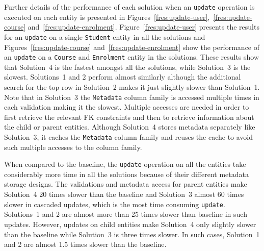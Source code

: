 Further details of the performance of each solution when an
\texttt{update} operation is executed on each entity is presented in 
Figures~\ref{fres:update-user},~\ref{fres:update-course}
and~\ref{fres:update-enrolment}.
Figure~\ref{fres:update-user} presents the results for an \texttt{update} on a
single \texttt{Student} entity in all the solutions and
Figures~\ref{fres:update-course} and~\ref{fres:update-enrolment} show the
performance of an \texttt{update} on a \texttt{Course} and \texttt{Enrolment}
entity in the solutions. These results show that Solution~4 is the fastest
amongst all the solutions, while Solution~3 is the slowest.
Solutions~1 and 2 perform almost similarly although the additional search for
the top row in Solution~2 makes it just slightly slower than Solution~1.
Note that in Solution~3 the \texttt{Metadata} column family is accessed multiple
times in each validation making it the slowest. Multiple accesses are needed in
order to first retrieve the relevant \ac{FK} constraints and then to retrieve
information about the child or parent entities. Although Solution~4 stores
metadata separately like Solution~3, it caches the \texttt{Metadata} column
family and reuses the cache to avoid such multiple accesses to the column
family.

When compared to the baseline, the \texttt{update} operation on all the
entities take considerably more time in all the solutions because of
their different metadata storage designs. The validations and metadata access
for parent entities make Solution~4 20 times slower than the baseline and
Solution~3 almost 60 times slower in cascaded updates, which is the most
time consuming \texttt{update}. 
Solutions~1 and 2 are almost more than 25 times slower than
baseline in such updates. However, updates on child entities make Solution~4
only slightly slower than the baseline while Solution~3 is three times slower.
In such cases, Solution~1 and 2 are almost 1.5 times slower than the baseline.

 
